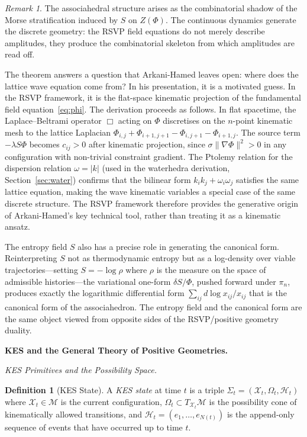 \documentclass[11pt]{article}
\theoremstyle{plain}
\theoremstyle{definition}
\newtheorem{definition}[theorem]{Definition}
\theoremstyle{remark}
\newtheorem{remark}[theorem]{Remark}
\newcommand{\Phif}{\Phi}
\newcommand{\Sf}{S}
\newcommand{\XKS}{\mathcal{X}}
\newcommand{\OmKS}{\Omega}
\newcommand{\HKS}{\mathcal{H}}
\begin{document}
\begin{remark}
The associahedral structure arises as the combinatorial shadow of the Morse stratification induced by $\Sf$ on $Z(\Phif)$. The continuous dynamics generate the discrete geometry: the RSVP field equations do not merely describe amplitudes, they produce the combinatorial skeleton from which amplitudes are read off.
\end{remark}

The theorem answers a question that Arkani-Hamed leaves open: where does the lattice wave equation come from? In his presentation, it is a motivated guess. In the RSVP framework, it is the flat-space kinematic projection of the fundamental field equation~\eqref{eq:phi}. The derivation proceeds as follows. In flat spacetime, the Laplace--Beltrami operator $\Box$ acting on $\Phif$ discretises on the $n$-point kinematic mesh to the lattice Laplacian $\Phif_{i,j} + \Phif_{i+1,j+1} - \Phif_{i,j+1} - \Phif_{i+1,j}$. The source term $-\lambda \Sf \Phif$ becomes $c_{ij} > 0$ after kinematic projection, since $\sigma\|\nabla\Phif\|^2 > 0$ in any configuration with non-trivial constraint gradient. The Ptolemy relation for the dispersion relation $\omega = |k|$ (used in the waterhedra derivation, Section~\ref{sec:water}) confirms that the bilinear form $k_i k_j + \omega_i \omega_j$ satisfies the same lattice equation, making the wave kinematic variables a special case of the same discrete structure. The RSVP framework therefore provides the generative origin of Arkani-Hamed's key technical tool, rather than treating it as a kinematic ansatz.

The entropy field $\Sf$ also has a precise role in generating the canonical form. Reinterpreting $\Sf$ not as thermodynamic entropy but as a log-density over viable trajectories---setting $\Sf = -\log \rho$ where $\rho$ is the measure on the space of admissible histories---the variational one-form $\delta\Sf / \Phif$, pushed forward under $\pi_n$, produces exactly the logarithmic differential form $\sum_{ij} d\log x_{ij} / x_{ij}$ that is the canonical form of the associahedron. The entropy field and the canonical form are the same object viewed from opposite sides of the RSVP/positive geometry duality.

\bigskip\noindent\textbf{KES and the General Theory of Positive Geometries.}
\label{sec:kes}

\medskip\noindent\textit{KES Primitives and the Possibility Space.}

\begin{definition}[KES State]
A \emph{KES state} at time $t$ is a triple $\Sigma_t = (\XKS_t, \OmKS_t, \HKS_t)$ where $\XKS_t \in \mathcal{M}$ is the current configuration, $\OmKS_t \subset T_{\XKS_t}\mathcal{M}$ is the possibility cone of kinematically allowed transitions, and $\HKS_t = (e_1, \ldots, e_{N(t)})$ is the append-only sequence of events that have occurred up to time $t$.
\end{definition}
\end{document}
